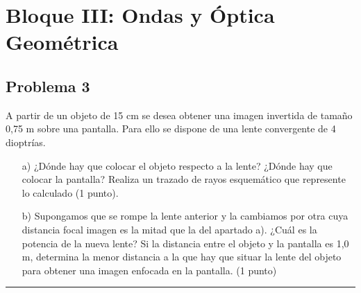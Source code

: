 \newpage

\section{Bloque III: Ondas y Óptica Geométrica}
\label{sec:ondopt_2022_jul_ord}

\subsection{Problema 3}
\label{subsec:P3_2022_jul_ord}

\begin{cajaenunciado}
A partir de un objeto de 15 cm se desea obtener una imagen invertida de tamaño 0,75 m sobre una pantalla. Para ello se dispone de una lente convergente de 4 dioptrías.
\begin{enumerate}
    \item[a)] ¿Dónde hay que colocar el objeto respecto a la lente? ¿Dónde hay que colocar la pantalla? Realiza un trazado de rayos esquemático que represente lo calculado (1 punto).
    \item[b)] Supongamos que se rompe la lente anterior y la cambiamos por otra cuya distancia focal imagen es la mitad que la del apartado a). ¿Cuál es la potencia de la nueva lente? Si la distancia entre el objeto y la pantalla es 1,0 m, determina la menor distancia a la que hay que situar la lente del objeto para obtener una imagen enfocada en la pantalla. (1 punto)
\end{enumerate}
\end{cajaenunciado}
\hrule

